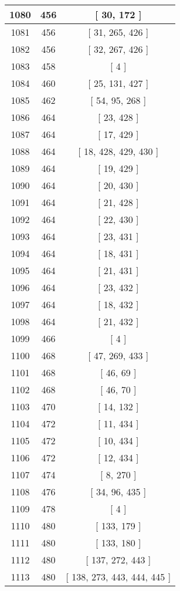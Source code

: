 \begin{center}
\begin{longtable}[H]{|| c c c ||}
\hline
1080 & 456 & [ 30, 172 ] \\ 
\hline
1081 & 456 & [ 31, 265, 426 ] \\ 
\hline
1082 & 456 & [ 32, 267, 426 ] \\ 
\hline
1083 & 458 & [ 4 ] \\ 
\hline
1084 & 460 & [ 25, 131, 427 ] \\ 
\hline
1085 & 462 & [ 54, 95, 268 ] \\ 
\hline
1086 & 464 & [ 23, 428 ] \\ 
\hline
1087 & 464 & [ 17, 429 ] \\ 
\hline
1088 & 464 & [ 18, 428, 429, 430 ] \\ 
\hline
1089 & 464 & [ 19, 429 ] \\ 
\hline
1090 & 464 & [ 20, 430 ] \\ 
\hline
1091 & 464 & [ 21, 428 ] \\ 
\hline
1092 & 464 & [ 22, 430 ] \\ 
\hline
1093 & 464 & [ 23, 431 ] \\ 
\hline
1094 & 464 & [ 18, 431 ] \\ 
\hline
1095 & 464 & [ 21, 431 ] \\ 
\hline
1096 & 464 & [ 23, 432 ] \\ 
\hline
1097 & 464 & [ 18, 432 ] \\ 
\hline
1098 & 464 & [ 21, 432 ] \\ 
\hline
1099 & 466 & [ 4 ] \\ 
\hline
1100 & 468 & [ 47, 269, 433 ] \\ 
\hline
1101 & 468 & [ 46, 69 ] \\ 
\hline
1102 & 468 & [ 46, 70 ] \\ 
\hline
1103 & 470 & [ 14, 132 ] \\ 
\hline
1104 & 472 & [ 11, 434 ] \\ 
\hline
1105 & 472 & [ 10, 434 ] \\ 
\hline
1106 & 472 & [ 12, 434 ] \\ 
\hline
1107 & 474 & [ 8, 270 ] \\ 
\hline
1108 & 476 & [ 34, 96, 435 ] \\ 
\hline
1109 & 478 & [ 4 ] \\ 
\hline
1110 & 480 & [ 133, 179 ] \\ 
\hline
1111 & 480 & [ 133, 180 ] \\ 
\hline
1112 & 480 & [ 137, 272, 443 ] \\ 
\hline
1113 & 480 & [ 138, 273, 443, 444, 445 ] \\ 

\end{longtable}
\end{center}
